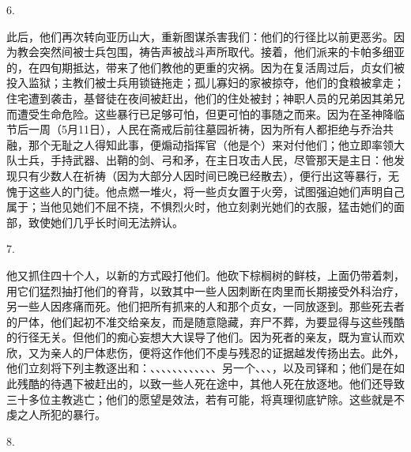 6. \par

此后，他们再次转向亚历山大，重新图谋杀害我们：他们的行径比以前更恶劣。因为教会突然间被士兵包围，祷告声被战斗声所取代。接着，他们派来的卡帕多细亚的，在四旬期抵达，带来了他们教他的更重的灾祸。因为在复活周过后，贞女们被投入监狱；主教们被士兵用锁链拖走；孤儿寡妇的家被掠夺，他们的食粮被拿走；住宅遭到袭击，基督徒在夜间被赶出，他们的住处被封；神职人员的兄弟因其弟兄而遭受生命危险。这些暴行已足够可怕，但更可怕的事随之而来。因为在圣神降临节后一周（5月11日），人民在斋戒后前往墓园祈祷，因为所有人都拒绝与乔治共融，那个无耻之人得知此事，便煽动指挥官（他是个）来对付他们；他立即率领大队士兵，手持武器、出鞘的剑、弓和矛，在主日攻击人民，尽管那天是主日：他发现只有少数人在祈祷（因为大部分人因时间已晚已经散去），便行出这等暴行，无愧于这些人的门徒。他点燃一堆火，将一些贞女置于火旁，试图强迫她们声明自己属于；当他见她们不屈不挠，不惧烈火时，他立刻剥光她们的衣服，猛击她们的面部，致使她们几乎长时间无法辨认。\par

7. \par

他又抓住四十个人，以新的方式殴打他们。他砍下棕榈树的鲜枝，上面仍带着刺，用它们猛烈抽打他们的脊背，以致其中一些人因刺断在肉里而长期接受外科治疗，另一些人因疼痛而死。他们把所有抓来的人和那个贞女，一同放逐到。那些死去者的尸体，他们起初不准交给亲友，而是随意隐藏，弃尸不葬，为要显得与这些残酷的行径无关。但他们的痴心妄想大大误导了他们。因为死者的亲友，既为宣认而欢欣，又为亲人的尸体悲伤，便将这作他们不虔与残忍的证据越发传扬出去。此外，他们立刻将下列主教逐出和：、、、、、、、、、、、、另一个、、、，以及司铎和；他们是在如此残酷的待遇下被赶出的，以致一些人死在途中，其他人死在放逐地。他们还导致三十多位主教逃亡；他们的愿望是效法，若有可能，将真理彻底铲除。这些就是不虔之人所犯的暴行。\par

8. \par

